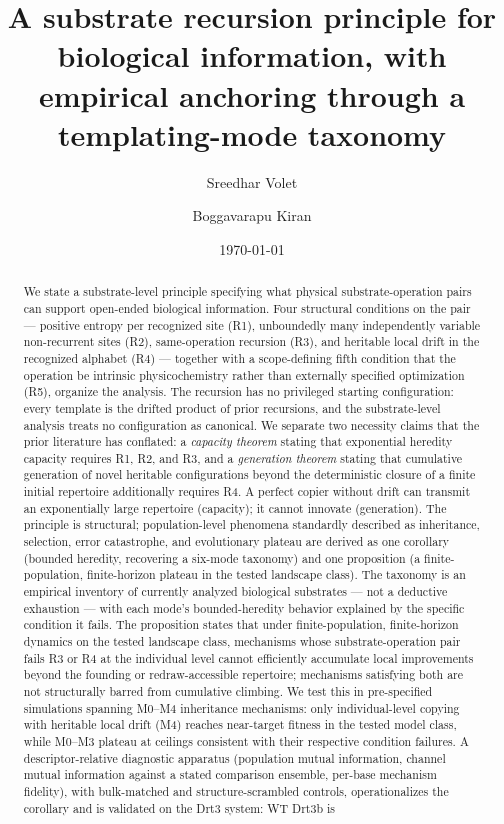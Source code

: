 \documentclass[aps,prx,reprint,amsmath,amssymb,floatfix,superscriptaddress,nofootinbib]{revtex4-2}
\theoremstyle{plain-thm}
\theoremstyle{definition-thm}
\begin{document}
\title{A substrate recursion principle for biological information, with empirical anchoring through a templating-mode taxonomy}

\author{Sreedhar Volet}

\author{Boggavarapu Kiran}

\date{\today}

\begin{abstract}
We state a substrate-level principle specifying what physical substrate-operation pairs can support open-ended biological information. Four structural conditions on the pair --- positive entropy per recognized site (R1), unboundedly many independently variable non-recurrent sites (R2), same-operation recursion (R3), and heritable local drift in the recognized alphabet (R4) --- together with a scope-defining fifth condition that the operation be intrinsic physicochemistry rather than externally specified optimization (R5), organize the analysis. The recursion has no privileged starting configuration: every template is the drifted product of prior recursions, and the substrate-level analysis treats no configuration as canonical. We separate two necessity claims that the prior literature has conflated: a \emph{capacity theorem} stating that exponential heredity capacity requires R1, R2, and R3, and a \emph{generation theorem} stating that cumulative generation of novel heritable configurations beyond the deterministic closure of a finite initial repertoire additionally requires R4. A perfect copier without drift can transmit an exponentially large repertoire (capacity); it cannot innovate (generation). The principle is structural; population-level phenomena standardly described as inheritance, selection, error catastrophe, and evolutionary plateau are derived as one corollary (bounded heredity, recovering a six-mode taxonomy) and one proposition (a finite-population, finite-horizon plateau in the tested landscape class). The taxonomy is an empirical inventory of currently analyzed biological substrates --- not a deductive exhaustion --- with each mode's bounded-heredity behavior explained by the specific condition it fails. The proposition states that under finite-population, finite-horizon dynamics on the tested landscape class, mechanisms whose substrate-operation pair fails R3 or R4 at the individual level cannot efficiently accumulate local improvements beyond the founding or redraw-accessible repertoire; mechanisms satisfying both are not structurally barred from cumulative climbing. We test this in pre-specified simulations spanning M0--M4 inheritance mechanisms: only individual-level copying with heritable local drift (M4) reaches near-target fitness in the tested model class, while M0--M3 plateau at ceilings consistent with their respective condition failures. A descriptor-relative diagnostic apparatus (population mutual information, channel mutual information against a stated comparison ensemble, per-base mechanism fidelity), with bulk-matched and structure-scrambled controls, operationalizes the corollary and is validated on the Drt3 system: WT Drt3b is 
\end{abstract}
\end{document}

